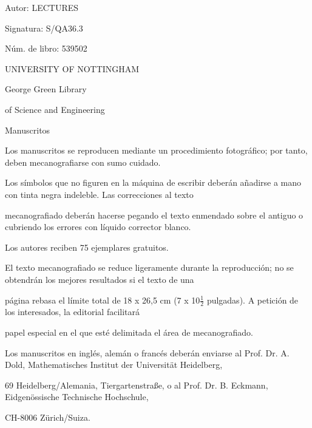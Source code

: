 \begin{center}
Autor: LECTURES\par
Signatura: S/QA36.3\par
Núm. de libro: 539502\par

UNIVERSITY OF NOTTINGHAM

George Green Library

of Science and Engineering
\end{center}

\noindent
Manuscritos\par
Los manuscritos se reproducen mediante un procedimiento fotográfico; por tanto, deben mecanografiarse con sumo cuidado.\par
Los símbolos que no figuren en la máquina de escribir deberán añadirse a mano con tinta negra indeleble. Las correcciones al texto\par
mecanografiado deberán hacerse pegando el texto enmendado sobre el antiguo o cubriendo los errores con líquido corrector blanco.\par
Los autores reciben 75 ejemplares gratuitos.\par
El texto mecanografiado se reduce ligeramente durante la reproducción; no se obtendrán los mejores resultados si el texto de una\par
página rebasa el límite total de 18 x 26,5 cm (7 x 10\ensuremath{\tfrac12} pulgadas). A petición de los interesados, la editorial facilitará\par
papel especial en el que esté delimitada el área de mecanografiado.\par
Los manuscritos en inglés, alemán o francés deberán enviarse al Prof. Dr. A. Dold, Mathematisches Institut der Universität Heidelberg,\par
69 Heidelberg/Alemania, Tiergartenstraße, o al Prof. Dr. B. Eckmann, Eidgenössische Technische Hochschule,\par
CH-8006 Zürich/Suiza.\par

